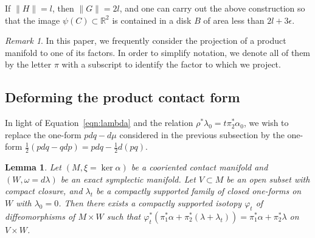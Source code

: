 \documentclass{amsart}
\newtheorem{lem}[thm]{Lemma}
\theoremstyle{remark}
\newtheorem{rmk}[thm]{Remark}
\def\R{{\mathbb R}}
\begin{document}
If $\| H \| = l$, then $\| G \| = 2 l$, and one can carry out the above construction so that the image $\psi (C) \subset \R^2$ is contained in a disk $B$ of area less than $2 l + 3 \epsilon$.

\begin{rmk}
In this paper, we frequently consider the projection of a product manifold to one of its factors.
In order to simplify notation, we denote all of them by the letter $\pi$ with a subscript to identify the factor to which we project.
\end{rmk}

\subsection{Deforming the product contact form}
In light of Equation~\ref{eqn:lambda} and the relation $\rho^* \lambda_0 = t \pi_2^* \alpha_0$, we wish to replace the one-form $p dq - d\mu$ considered in the previous subsection by the one-form $\frac{1}{2} (p dq - q dp) = p dq - \frac{1}{2} d (p q)$.

\begin{lem}
Let $(M, \xi = \ker \alpha)$ be a cooriented contact manifold and $(W, \omega = d\lambda)$ be an exact symplectic manifold.
Let $V \subset M$ be an open subset with compact closure, and $\lambda_t$ be a compactly supported family of closed one-forms on $W$ with $\lambda_0 = 0$.
Then there exists a compactly supported isotopy $\varphi_t$ of diffeomorphisms of $M \times W$ such that $\varphi_t^* (\pi_1^* \alpha + \pi_2^* (\lambda + \lambda_t)) = \pi_1^* \alpha + \pi_2^* \lambda$ on $V \times W$.
\end{lem}
\end{document}
